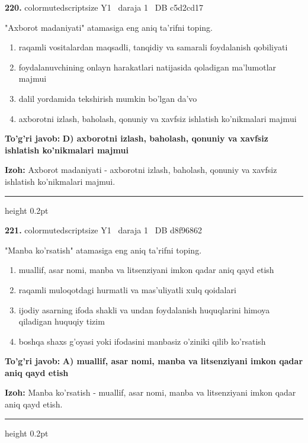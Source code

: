 \documentclass[10pt,a4paper,oneside]{article}
\begin{document}
\noindent\textbf{\color{ink}220.}  {color{muted}scriptsize Y1 \textbullet\ daraja 1 \textbullet\ DB c5d2cd17}
\par
"Axborot madaniyati" atamasiga eng aniq ta'rifni toping.
\begin{enumerate}[label=\Alph*),leftmargin=9mm]
\item raqamli vositalardan maqsadli, tanqidiy va samarali foydalanish qobiliyati
\item foydalanuvchining onlayn harakatlari natijasida qoladigan ma'lumotlar majmui
\item dalil yordamida tekshirish mumkin bo'lgan da'vo
\item axborotni izlash, baholash, qonuniy va xavfsiz ishlatish ko'nikmalari majmui
\end{enumerate}
\begin{tcolorbox}[enhanced,breakable,colback=teal!4,colframe=teal!50!black,boxrule=0.5pt,arc=1.1mm,left=3mm,right=3mm,top=1.7mm,bottom=1.7mm,before skip=2mm,after skip=2mm]
\textbf{\color{teal}To'g'ri javob:} \textbf{D) axborotni izlash, baholash, qonuniy va xavfsiz ishlatish ko'nikmalari majmui}
\par\smallskip
\textbf{Izoh:} Axborot madaniyati - axborotni izlash, baholash, qonuniy va xavfsiz ishlatish ko'nikmalari majmui.
\end{tcolorbox}
\vspace{2mm}\hrule height 0.2pt \vspace{3mm}

\noindent\textbf{\color{ink}221.}  {color{muted}scriptsize Y1 \textbullet\ daraja 1 \textbullet\ DB d8f96862}
\par
"Manba ko'rsatish" atamasiga eng aniq ta'rifni toping.
\begin{enumerate}[label=\Alph*),leftmargin=9mm]
\item muallif, asar nomi, manba va litsenziyani imkon qadar aniq qayd etish
\item raqamli muloqotdagi hurmatli va mas'uliyatli xulq qoidalari
\item ijodiy asarning ifoda shakli va undan foydalanish huquqlarini himoya qiladigan huquqiy tizim
\item boshqa shaxs g'oyasi yoki ifodasini manbasiz o'ziniki qilib ko'rsatish
\end{enumerate}
\begin{tcolorbox}[enhanced,breakable,colback=teal!4,colframe=teal!50!black,boxrule=0.5pt,arc=1.1mm,left=3mm,right=3mm,top=1.7mm,bottom=1.7mm,before skip=2mm,after skip=2mm]
\textbf{\color{teal}To'g'ri javob:} \textbf{A) muallif, asar nomi, manba va litsenziyani imkon qadar aniq qayd etish}
\par\smallskip
\textbf{Izoh:} Manba ko'rsatish - muallif, asar nomi, manba va litsenziyani imkon qadar aniq qayd etish.
\end{tcolorbox}
\vspace{2mm}\hrule height 0.2pt \vspace{3mm}
\end{document}
